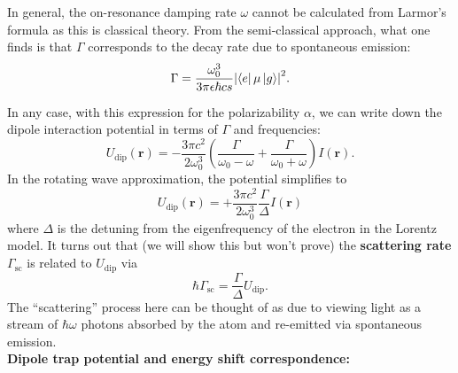 \documentclass{book}
\theoremstyle{definition}
\newcommand{\al}{\alpha}
\newcommand{\f}[2]{\frac{#1}{#2}}
\newcommand{\lp}{\left(}
\newcommand{\rp}{\right)}
\begin{document}
\begin{framed}
	 
	 In general, the on-resonance damping rate $\omega$ cannot be calculated from Larmor's formula as this is classical theory. From the semi-classical approach, what one finds is that $\Gamma$ corresponds to the decay rate due to spontaneous emission: 
	 \begin{equation*}
	 \Gamma = \f{\omega_0^3}{3\pi \epsilon\hbar c^^3}\abs{\bra{e} \mu \ket{g}}^2.
	 \end{equation*}
	 
	 
	 
	 In any case, with this expression for the polarizability $\al$, we can write down the dipole interaction potential in terms of $\Gamma$ and frequencies:
	 \begin{equation*}
	 U_\text{dip}(\mathbf{r}) = -\f{3\pi c^2}{2\omega_0^3}\lp \f{\Gamma}{\omega_0 - \omega} + \f{\Gamma}{\omega_0 + \omega} \rp I(\mathbf{r}).
	 \end{equation*}
	 In the rotating wave approximation, the potential simplifies to 
	 \begin{equation*}
	 U_\text{dip}(\mathbf{r}) = +\f{3\pi c^2}{2\omega_0^3}\f{\Gamma}{\Delta} I(\mathbf{r}) 
	 \end{equation*}
	 where $\Delta$ is the detuning from the eigenfrequency of the electron in the Lorentz model. It turns out that (we will show this but won't prove) the \textbf{scattering rate} $\Gamma_\text{sc}$ is related to $U_\text{dip}$ via
	 \begin{equation*}
	 \hbar \Gamma_\text{sc} = \f{\Gamma}{\Delta} U_\text{dip}. 
	 \end{equation*}
	 The ``scattering'' process here can be thought of as due to viewing light as a stream of $\hbar \omega$ photons absorbed by the atom and re-emitted via spontaneous emission. \\
	 
	 
	 \noindent \textbf{Dipole trap potential and energy shift correspondence:}\\
	 

\end{framed}
\end{document}
